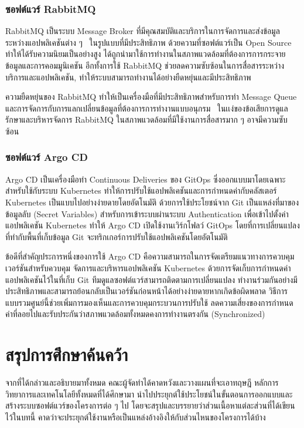 \documentclass[12pt,one side,openright,a4paper]{cpe-thesis-th}
\newcommand{\thaijustify}[1]{%
  \par\hspace{30pt}\justifying
  #1
}
\begin{document}
\subsubsection{ซอฟต์แวร์ RabbitMQ}
\thaijustify{
  RabbitMQ เป็นระบบ Message Broker ที่มีคุณสมบัติและบริการในการจัดการและส่งข้อมูลระหว่างแอปพลิเคชันต่าง ๆ~\cite{rabbitmq} ในรูปแบบที่มีประสิทธิภาพ ด้วยความที่ซอฟต์แวร์เป็น Open Source ทำให้ได้รับความนิยมเป็นอย่างสูง ได้ถูกนำมาใช้การทำงานในสภาพแวดล้อมที่ต้องการการกระจายข้อมูลและการคอมมูนิเคชัน อีกทั้งการใช้ RabbitMQ ช่วยลดความซับซ้อนในการสื่อสารระหว่างบริการและแอปพลิเคชัน, ทำให้ระบบสามารถทำงานได้อย่างยืดหยุ่นและมีประสิทธิภาพ~\cite{rabbitmq}
}
\thaijustify{
  ความยืดหยุ่นของ RabbitMQ ทำให้เป็นเครื่องมือที่มีประสิทธิภาพสำหรับการทำ Message Queue และการจัดการกับการแลกเปลี่ยนข้อมูลที่ต้องการการทำงานแบบอนุกรม~\cite{roy17rabbitmq} ในเเง่ของข้อเสียการดูแลรักษาและบริหารจัดการ RabbitMQ ในสภาพแวดล้อมที่มีใช้งานการสื่อสารมาก ๆ อาจมีความซับซ้อน~\cite{hanwell17rabbitmq}
}
\subsubsection{ซอฟต์แวร์ Argo CD}
\thaijustify{
  Argo CD เป็นเครื่องมือทำ Continuous Deliveries ของ GitOps ซึ่งออกแบบมาโดยเฉพาะสำหรับใช้กับระบบ Kubernetes ทำให้การปรับใช้แอปพลิเคชันและการกำหนดค่ากับคลัสเตอร์ Kubernetes เป็นแบบไปอย่างง่ายดายโดยอัตโนมัติ ด้วยการใช้ประโยชน์จาก Git เป็นแหล่งที่มาของข้อมูลลับ (Secret Variables) สำหรับการเข้าระบบผ่านระบบ Authentication เพื่อเข้าไปตั้งค่าแอปพลิเคชัน Kubernetes ทำให้ Argo CD เปิดใช้งานเวิร์กโฟลว์ GitOps โดยที่การเปลี่ยนแปลงที่ทำกับพื้นที่เก็บข้อมูล Git จะทริกเกอร์การปรับใช้แอปพลิเคชันโดยอัตโนมัติ~\cite{argodoc}
}
\thaijustify{
  ข้อดีที่สำคัญประการหนึ่งของการใช้ Argo CD คือความสามารถในการจัดเตรียมแนวทางการควบคุมเวอร์ชันสำหรับควบคุม จัดการและบริหารแอปพลิเคชัน Kubernetes ด้วยการจัดเก็บการกำหนดค่าแอปพลิเคชันไว้ในที่เก็บ Git ทีมดูแลซอฟต์แวร์สามารถติดตามการเปลี่ยนแปลง ทำงานร่วมกันอย่างมีประสิทธิภาพและสามารถย้อนกลับเป็นเวอร์ชันก่อนหน้าได้อย่างง่ายดายหากเกิดข้อผิดพลาด วิธีการแบบรวมศูนย์นี้ช่วยเพิ่มการมองเห็นและการควบคุมกระบวนการปรับใช้ ลดความเสี่ยงของการกำหนดค่าที่ลอยไปและรับประกันว่าสภาพแวดล้อมทั้งหมดคงการทำงานตรงกัน (Synchronized) ~\cite{argodocsync}
}
\section{สรุปการศึกษาค้นคว้า}
\thaijustify{
  จากที่ได้กล่าวและอธิบายมาทั้งหมด คณะผู้จัดทำได้คาดหวังและวางแผนที่จะเอาทฤษฎี หลักการ วิทยาการและเทคโนโลยีทั้งหมดที่ได้ศึกษามา นำไปประยุกต์ใช้ประโยชน์ในขั้นตอนการออกแบบและสร้างระบบซอฟต์แวร์ของโครงการต่อ ๆ ไป โดยจะสรุปและบรรยายว่าส่วนเนื้อหาแต่ละส่วนที่ได้เขียนไว้ในบทนี้ คาดว่าจะประยุกต์ใช้งานหรือเป็นแหล่งอ้างอิงให้กับส่วนไหนของโครงการได้บ้าง
}
\end{document}
